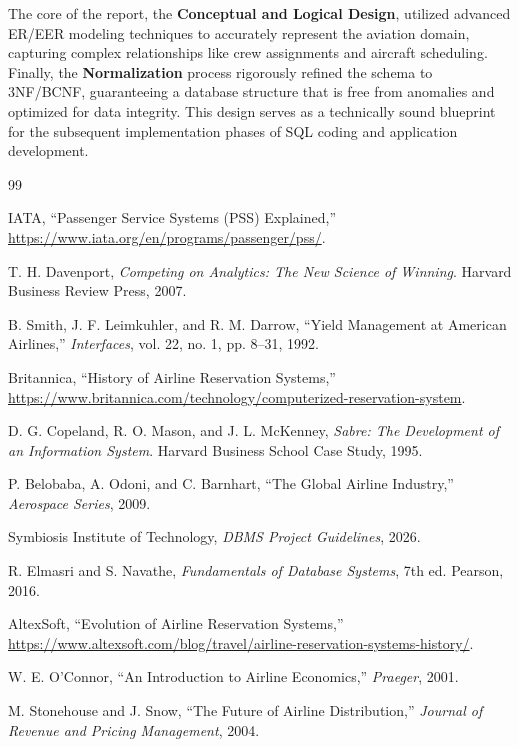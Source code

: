 \documentclass[12pt, a4paper]{article}
\begin{document}
	The core of the report, the \textbf{Conceptual and Logical Design}, utilized advanced ER/EER modeling techniques to accurately represent the aviation domain, capturing complex relationships like crew assignments and aircraft scheduling. Finally, the \textbf{Normalization} process rigorously refined the schema to 3NF/BCNF, guaranteeing a database structure that is free from anomalies and optimized for data integrity. This design serves as a technically sound blueprint for the subsequent implementation phases of SQL coding and application development.
	
	\newpage
	\begin{thebibliography}{99}
		
		 IATA, ``Passenger Service Systems (PSS) Explained,'' \url{https://www.iata.org/en/programs/passenger/pss/}.
		
		 T. H. Davenport, \textit{Competing on Analytics: The New Science of Winning}. Harvard Business Review Press, 2007.
		
		 B. Smith, J. F. Leimkuhler, and R. M. Darrow, ``Yield Management at American Airlines,'' \textit{Interfaces}, vol. 22, no. 1, pp. 8--31, 1992.
		
		 Britannica, ``History of Airline Reservation Systems,'' \url{https://www.britannica.com/technology/computerized-reservation-system}.
		
		 D. G. Copeland, R. O. Mason, and J. L. McKenney, \textit{Sabre: The Development of an Information System}. Harvard Business School Case Study, 1995.
		
		 P. Belobaba, A. Odoni, and C. Barnhart, ``The Global Airline Industry,'' \textit{Aerospace Series}, 2009.
		
		 Symbiosis Institute of Technology, \textit{DBMS Project Guidelines}, 2026.
		
		 R. Elmasri and S. Navathe, \textit{Fundamentals of Database Systems}, 7th ed. Pearson, 2016.
		
		 AltexSoft, ``Evolution of Airline Reservation Systems,'' \url{https://www.altexsoft.com/blog/travel/airline-reservation-systems-history/}.
		
		 W. E. O'Connor, ``An Introduction to Airline Economics,'' \textit{Praeger}, 2001.
		
		 M. Stonehouse and J. Snow, ``The Future of Airline Distribution,'' \textit{Journal of Revenue and Pricing Management}, 2004.
		

\end{thebibliography}
\end{document}
